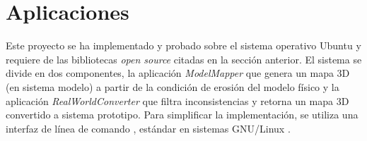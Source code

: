 \section{Aplicaciones}

Este proyecto se ha implementado y probado sobre el sistema operativo Ubuntu \cite{ubuntu} y requiere de las bibliotecas \textit{open source} citadas en la sección anterior. El sistema se divide en dos componentes, la aplicación \textit{ModelMapper} que genera un mapa 3D (en sistema modelo) a partir de la condición de erosión del modelo físico y la aplicación \textit{RealWorldConverter} que filtra inconsistencias y retorna un mapa 3D convertido a sistema prototipo. Para simplificar la implementación, se utiliza una interfaz de línea de comando \cite{wiki-linea-de-comandos}, estándar en sistemas GNU/Linux \cite{wiki-gnu-linux}.

